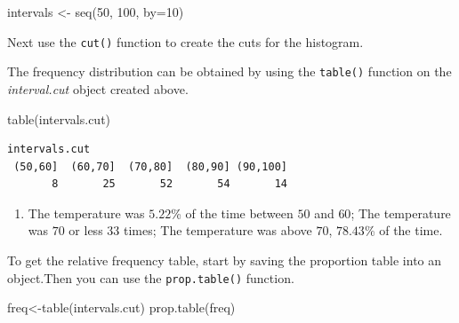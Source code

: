 \documentclass[
  letterpaper,
  DIV=11,
  numbers=noendperiod]{scrreprt}
\newenvironment{Shaded}{\begin{snugshade}}{\end{snugshade}}
\newcommand{\AttributeTok}[1]{\textcolor[rgb]{0.40,0.45,0.13}{#1}}
\newcommand{\ConstantTok}[1]{\textcolor[rgb]{0.56,0.35,0.01}{#1}}
\newcommand{\DecValTok}[1]{\textcolor[rgb]{0.68,0.00,0.00}{#1}}
\newcommand{\FunctionTok}[1]{\textcolor[rgb]{0.28,0.35,0.67}{#1}}
\newcommand{\NormalTok}[1]{\textcolor[rgb]{0.00,0.23,0.31}{#1}}
\newcommand{\OtherTok}[1]{\textcolor[rgb]{0.00,0.23,0.31}{#1}}
\newcommand{\SpecialCharTok}[1]{\textcolor[rgb]{0.37,0.37,0.37}{#1}}
\providecommand{\tightlist}{%
  \setlength{\itemsep}{0pt}\setlength{\parskip}{0pt}}\usepackage{longtable,booktabs,array}
\begin{document}
\begin{Shaded}
\begin{Highlighting}[numbers=left,,]
\NormalTok{intervals }\OtherTok{\textless{}{-}} \FunctionTok{seq}\NormalTok{(}\DecValTok{50}\NormalTok{, }\DecValTok{100}\NormalTok{, }\AttributeTok{by=}\DecValTok{10}\NormalTok{)}
\end{Highlighting}
\end{Shaded}

Next use the \texttt{cut()} function to create the cuts for the
histogram.

\begin{Shaded}
\end{Shaded}

The frequency distribution can be obtained by using the \texttt{table()}
function on the \emph{interval.cut} object created above.

\begin{Shaded}
\begin{Highlighting}[numbers=left,,]
\FunctionTok{table}\NormalTok{(intervals.cut)}
\end{Highlighting}
\end{Shaded}

\begin{verbatim}
intervals.cut
 (50,60]  (60,70]  (70,80]  (80,90] (90,100] 
       8       25       52       54       14 
\end{verbatim}

\begin{enumerate}
\def\labelenumi{\arabic{enumi}.}
\setcounter{enumi}{1}
\tightlist
\item
  The temperature was \(5.22\)\% of the time between \(50\) and \(60\);
  The temperature was \(70\) or less \(33\) times; The temperature was
  above \(70\), \(78.43\)\% of the time.
\end{enumerate}

To get the relative frequency table, start by saving the proportion
table into an object.Then you can use the \texttt{prop.table()}
function.

\begin{Shaded}
\begin{Highlighting}[numbers=left,,]
\NormalTok{freq}\OtherTok{\textless{}{-}}\FunctionTok{table}\NormalTok{(intervals.cut) }
\FunctionTok{prop.table}\NormalTok{(freq)}
\end{Highlighting}
\end{Shaded}
\end{document}
